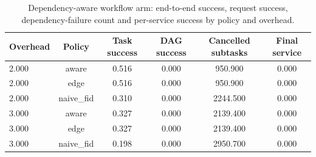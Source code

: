 \begin{table}
\centering
\scriptsize
\caption{Dependency-aware workflow arm: end-to-end success, request success, dependency-failure count and per-service success by policy and overhead.}
\label{tab:p2-workflow}
\begin{tabular}{lccccc}
\toprule
Overhead & Policy & Task success & DAG success & Cancelled subtasks & Final service \\
\midrule
2.000 & aware & 0.516 & 0.000 & 950.900 & 0.000 \\
2.000 & edge & 0.516 & 0.000 & 950.900 & 0.000 \\
2.000 & naive\_fid & 0.310 & 0.000 & 2244.500 & 0.000 \\
3.000 & aware & 0.327 & 0.000 & 2139.400 & 0.000 \\
3.000 & edge & 0.327 & 0.000 & 2139.400 & 0.000 \\
3.000 & naive\_fid & 0.198 & 0.000 & 2950.700 & 0.000 \\
\bottomrule
\end{tabular}
\par\vspace{2pt}{\footnotesize\raggedright Each request is a three-service DAG. Unlike the independent-task arm, dependency failures are exercised: cancelled descendants are counted in the fail-dependency column.\par}
\end{table}

